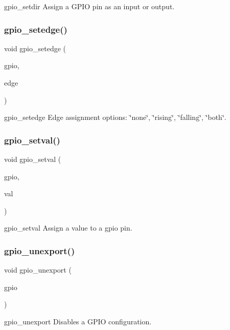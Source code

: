 gpio\+\_\+setdir Assign a G\+P\+IO pin as an input or output. \mbox{\label{gpio_8c_ac458f19324ea884432b863ad8a8a6413}} 
\subsubsection{gpio\+\_\+setedge()}
{\footnotesize\ttfamily void gpio\+\_\+setedge (\begin{DoxyParamCaption}\item[{uint}]{gpio,  }\item[{char $\ast$}]{edge }\end{DoxyParamCaption})}

gpio\+\_\+setedge Edge assignment options\+: \char`\"{}none\char`\"{}, \char`\"{}rising\char`\"{}, \char`\"{}falling\char`\"{}, \char`\"{}both\char`\"{}. \mbox{\label{gpio_8c_a11ab695374d8ee44aee0cb14dece82ce}} 
\subsubsection{gpio\+\_\+setval()}
{\footnotesize\ttfamily void gpio\+\_\+setval (\begin{DoxyParamCaption}\item[{uint}]{gpio,  }\item[{enum \textbf{ P\+I\+N\+\_\+\+V\+AL}}]{val }\end{DoxyParamCaption})}

gpio\+\_\+setval Assign a value to a gpio pin. \mbox{\label{gpio_8c_abbbd59c075ac8502be7652339e0d6365}} 
\subsubsection{gpio\+\_\+unexport()}
{\footnotesize\ttfamily void gpio\+\_\+unexport (\begin{DoxyParamCaption}\item[{uint}]{gpio }\end{DoxyParamCaption})}

gpio\+\_\+unexport Disables a G\+P\+IO configuration. 